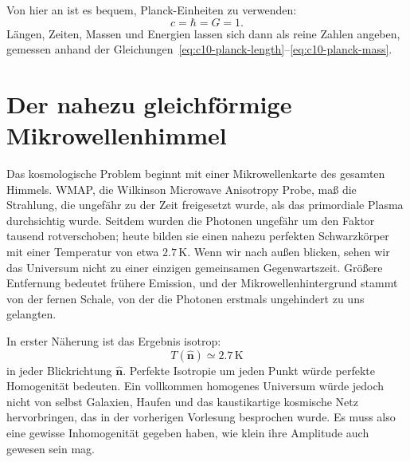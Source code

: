 Von hier an ist es bequem, Planck-Einheiten zu verwenden:
\begin{equation}
c=\hbar=G=1.
\label{eq:c10-planck-units}
\end{equation}
Längen, Zeiten, Massen und Energien lassen sich dann als reine Zahlen angeben, gemessen anhand der Gleichungen~\eqref{eq:c10-planck-length}--\eqref{eq:c10-planck-mass}.

\section{Der nahezu gleichförmige Mikrowellenhimmel}

Das kosmologische Problem beginnt mit einer Mikrowellenkarte des gesamten Himmels. WMAP, die Wilkinson Microwave Anisotropy Probe, maß die Strahlung, die ungefähr zu der Zeit freigesetzt wurde, als das primordiale Plasma durchsichtig wurde. Seitdem wurden die Photonen ungefähr um den Faktor tausend rotverschoben; heute bilden sie einen nahezu perfekten Schwarzkörper mit einer Temperatur von etwa \(2.7\,\mathrm K\). Wenn wir nach außen blicken, sehen wir das Universum nicht zu einer einzigen gemeinsamen Gegenwartszeit. Größere Entfernung bedeutet frühere Emission, und der Mikrowellenhintergrund stammt von der fernen Schale, von der die Photonen erstmals ungehindert zu uns gelangten.

\begin{classroomqa}
\end{classroomqa}

In erster Näherung ist das Ergebnis isotrop:
\[
T(\hat{\mathbf n})\simeq 2.7\,\mathrm K
\]
in jeder Blickrichtung \(\hat{\mathbf n}\). Perfekte Isotropie um jeden Punkt würde perfekte Homogenität bedeuten. Ein vollkommen homogenes Universum würde jedoch nicht von selbst Galaxien, Haufen und das kaustikartige kosmische Netz hervorbringen, das in der vorherigen Vorlesung besprochen wurde. Es muss also eine gewisse Inhomogenität gegeben haben, wie klein ihre Amplitude auch gewesen sein mag.

